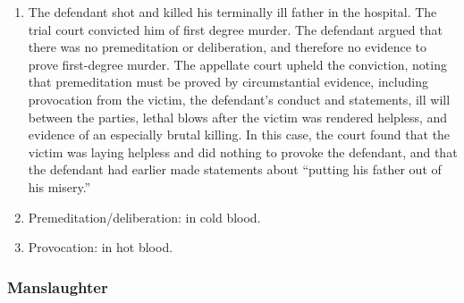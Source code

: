 \begin{enumerate}
    \item The defendant shot and killed his terminally ill father in the hospital. The trial court convicted him of first degree murder. The defendant argued that there was no premeditation or deliberation, and therefore no evidence to prove first-degree murder. The appellate court upheld the conviction, noting that premeditation must be proved by circumstantial evidence, including provocation from the victim, the defendant's conduct and statements, ill will between the parties, lethal blows after the victim was rendered helpless, and evidence of an especially brutal killing. In this case, the court found that the victim was laying helpless and did nothing to provoke the defendant, and that the defendant had earlier made statements about ``putting his father out of his misery.''
    \item Premeditation/deliberation: in cold blood.
    \item Provocation: in hot blood.
\end{enumerate}

\subsubsection{Manslaughter}

